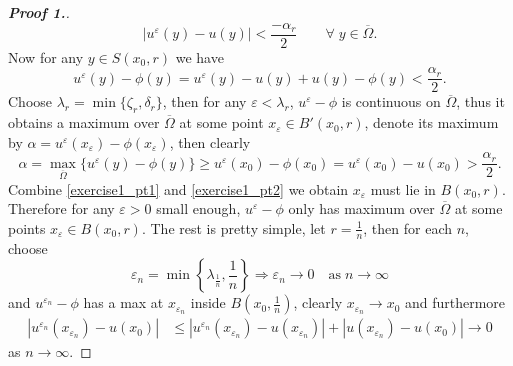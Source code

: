\documentclass[12pt, oneside]{amsart}  	%
\begin{document}
\begin{proof}[\textbf{Proof 1.}]
\begin{equation*}
|u^\varepsilon(y) - u(y)| < \frac{-\alpha_r}{2} \qquad\forall\;y\in \overline{\Omega}.
\end{equation*}
Now for any $y\in S(x_0,r)$ we have
\begin{equation}\label{exercise1_pt1}
u^\varepsilon(y) - \phi(y) = u^\varepsilon(y) - u(y)  + u(y) - \phi(y) < \frac{\alpha_r}{2}.
\end{equation}
Choose $\lambda_r = \min\{\zeta_r,\delta_r\}$, then for any $\varepsilon<\lambda_r$, $u^\varepsilon - \phi$ is continuous on $\overline{\Omega}$, thus it obtains a maximum over $\overline{\Omega}$ at some point $x_\varepsilon \in B'(x_0,r)$, denote its maximum by $\alpha = u^\varepsilon (x_\varepsilon) - \phi(x_\varepsilon)$, then clearly
\begin{equation}\label{exercise1_pt2}
\alpha = \max_{\overline{\Omega}} \{u^\varepsilon(y) - \phi(y)\} \geq u^\varepsilon(x_0) - \phi(x_0) = u^\varepsilon(x_0) - u(x_0)  > \frac{\alpha_r}{2}.
\end{equation}
Combine \eqref{exercise1_pt1} and \eqref{exercise1_pt2} we obtain $x_\varepsilon$ must lie in $B(x_0,r)$. Therefore for any $\varepsilon>0$ small enough, $u^\varepsilon -\phi$ only has maximum over $\overline{\Omega}$ at some points $x_\varepsilon \in B(x_0,r)$. The rest is pretty simple, let $r = \frac{1}{n}$, then for each $n$, choose 
\begin{equation*}
\varepsilon_n = \min\left\lbrace \lambda_{\frac{1}{n}},\frac{1}{n} \right\rbrace  \Longrightarrow \varepsilon_n \longrightarrow 0 \quad\text{as}\;n\longrightarrow\infty
\end{equation*}
and $u^{\varepsilon_n}- \phi$ has a max at $x_{\varepsilon_n}$ inside $B\left(x_0,\frac{1}{n}\right)$, clearly $x_{\varepsilon_n}\longrightarrow x_0$ and furthermore
\begin{align*}
\left|u^{\varepsilon_n}(x_{\varepsilon_n}) - u(x_0)\right|  &\leq \left|u^{\varepsilon_n}(x_{\varepsilon_n}) - u(x_{\varepsilon_n})\right|  + \left|u(x_{\varepsilon_n}) - u(x_0)\right|\longrightarrow 0
\end{align*}
as $n\longrightarrow \infty$.
\end{proof}
\end{document}
